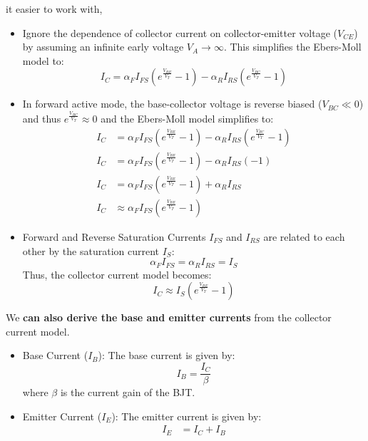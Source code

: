 \begin{itemize}
\begin{itemize}
        it easier to work with,
        \begin{itemize}
          \item Ignore the dependence of collector current on collector-emitter
            voltage (\(V_{CE}\)) by assuming an infinite early voltage \(V_A \to \infty\).
            This simplifies the Ebers-Moll model to:
            \[
              I_C = \alpha_F I_{FS} \left( e^{\frac{V_{BE}}{V_T}} - 1 \right) - \alpha_R I_{RS} \left( e^{\frac{V_{BC}}{V_T}} - 1 \right)
            \]
          \item In forward active mode, the base-collector voltage is reverse biased
            (\(V_{BC} \ll 0\)) and thus \( e^{\frac{V_{BC}}{V_T}} \approx 0 \) and the
            Ebers-Moll model simplifies to:
            \begin{align*}
              I_C &= \alpha_F I_{FS} \left( e^{\frac{V_{BE}}{V_T}} - 1 \right) - \alpha_R I_{RS} \left( e^{\frac{V_{BC}}{V_T}} - 1 \right) \\
              I_C &= \alpha_F I_{FS} \left( e^{\frac{V_{BE}}{V_T}} - 1 \right) - \alpha_R I_{RS}(-1) \\
              I_C &= \alpha_F I_{FS} \left( e^{\frac{V_{BE}}{V_T}} - 1 \right) + \alpha_R I_{RS} \\
              I_C &\approx \alpha_F I_{FS} \left( e^{\frac{V_{BE}}{V_T}} - 1 \right)
            \end{align*}
          \item Forward and Reverse Saturation Currents \( I_{FS} \) and \(I_{RS}\)
            are related to each other by the saturation current \(I_{S}\):
            \[
              \alpha_F I_{FS} = \alpha_R I_{RS} = I_S
            \]
            Thus, the collector current model becomes:
            \[
              I_C \approx I_S \left( e^{\frac{V_{BE}}{V_T}} - 1 \right)
            \]
        \end{itemize}
        We \textbf{can also derive the base and emitter currents} from the collector
        current model.
        \begin{itemize}
          \item Base Current (\(I_B\)):
            The base current is given by:
            \[
              I_B = \frac{I_C}{\beta}
            \]
            where \(\beta\) is the current gain of the BJT.
          \item Emitter Current (\(I_E\)):
            The emitter current is given by:
            \begin{align*}
              I_E &= I_C + I_B \\

\end{align*}
\end{itemize}
\end{itemize}
\end{itemize}
